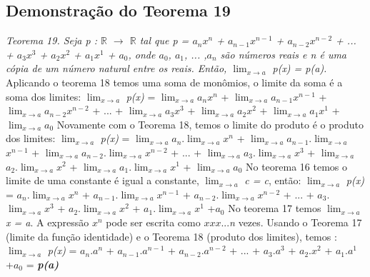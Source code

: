 \subsection{Demonstração do Teorema 19}
\textit{Teorema 19. Seja p : $\mathbb{R}$ $\rightarrow$ $\mathbb{R}$ tal que p = $a_{n}$$x^{n}$ + $a_{n-1}$$x^{n-1}$ + $a_{n-2}$$x^{n-2}$ + ... + $a_{3}$$x^{3}$ + $a_{2}$$x^{2}$ + $a_{1}$$x^{1}$ + $a_{0}$, onde $a_{0}$, $a_{1}$, ... ,$a_{n}$ são números reais e n é uma cópia de um número natural entre os reais. Então, $\lim_{x\rightarrow a}$ p(x) = p(a).}
\newline \newline
Aplicando o teorema 18 temos uma soma de monômios, o limite da soma é a soma dos limites: \newline
$\lim_{x\rightarrow a}$ \textit{p(x)} = $\lim_{x\rightarrow a}$$a_{n}$$x^{n}$ + $\lim_{x\rightarrow a}$$a_{n-1}$$x^{n-1}$ + $\lim_{x\rightarrow a}$$a_{n-2}$$x^{n-2}$ + ... + $\lim_{x\rightarrow a}$$a_{3}$$x^{3}$ + $\lim_{x\rightarrow a}$$a_{2}$$x^{2}$ + $\lim_{x\rightarrow a}$$a_{1}$$x^{1}$ + $\lim_{x\rightarrow a}$$a_{0}$
\newline \newline
Novamente com o Teorema 18, temos o limite do produto é o produto dos limites:  \newline
$\lim_{x\rightarrow a}$ \textit{p(x)} = $\lim_{x\rightarrow a}$$a_{n}$.$\lim_{x\rightarrow a}$$x^{n}$ + $\lim_{x\rightarrow a}$$a_{n-1}$.$\lim_{x\rightarrow a}$$x^{n-1}$ + $\lim_{x\rightarrow a}$$a_{n-2}$.$\lim_{x\rightarrow a}$$x^{n-2}$ + ... + $\lim_{x\rightarrow a}$$a_{3}$.$\lim_{x\rightarrow a}$$x^{3}$ + $\lim_{x\rightarrow a}$$a_{2}$.$\lim_{x\rightarrow a}$$x^{2}$ + $\lim_{x\rightarrow a}$$a_{1}$.$\lim_{x\rightarrow a}$$x^{1}$ + $\lim_{x\rightarrow a}$$a_{0}$ 
\newline \newline
No teorema 16 temos o limite de uma constante é igual a constante, $\lim_{x\rightarrow a}$ \textit{c = c}, então: 
\newline
$\lim_{x\rightarrow a}$ \textit{p(x)} = $a_{n}$.$\lim_{x\rightarrow a}$$x^{n}$ + $a_{n-1}$.$\lim_{x\rightarrow a}$$x^{n-1}$ + $a_{n-2}$.$\lim_{x\rightarrow a}$$x^{n-2}$ + ... + $a_{3}$.$\lim_{x\rightarrow a}$$x^{3}$ + $a_{2}$.$\lim_{x\rightarrow a}$$x^{2}$ + $a_{1}$.$\lim_{x\rightarrow a}$$x^{1}$ +$a_{0}$ 
\newline \newline
No teorema 17 temos $\lim_{x\rightarrow a}$ \textit{x = a}. A expressão $x^{n}$ pode ser escrita como $x$$x$$x$...\textit{n} vezes. Usando o Teorema 17 (limite da função identidade) e o Teorema 18 (produto dos limites), temos :\newline
$\lim_{x\rightarrow a}$ \textit{p(x)} = $a_{n}$.$a^{n}$ + $a_{n-1}$.$a^{n-1}$ + $a_{n-2}$.$a^{n-2}$ + ... + $a_{3}$.$a^{3}$ + $a_{2}$.$x^{2}$ + $a_{1}$.$a^{1}$ +$a_{0}$ = \textbf{\textit{p(a)}}




